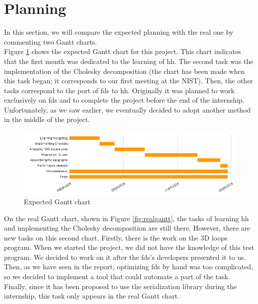 
\clearpage{}
\section{Planning}

In this section, we will compare the expected planning with the real one by
commenting two Gantt charts.\\

Figure \ref{fig:expectedgantt} shows the expected Gantt chart for this
project. This chart indicates that the first month was dedicated to the learning
of \gls{hh}. The second task was the implementation of the Cholesky
decomposition (the chart has been made when this task began; it corresponds to
our first meeting at the NIST). Then, the other tasks correspond to the port of
\gls{fds} to \gls{hh}. Originally it was planned to work exclusively on
\gls{fds} and to complete the project before the end of the internship.
Unfortunately, as we saw earlier, we eventually decided to adopt another method
in the middle of the project.

\begin{figure}[h!]
  \begin{center}
    \includegraphics[scale=0.5]{img/expected-gantt-chart.png}
    \caption{Expected Gantt chart}
    \label{fig:expectedgantt}
  \end{center}
\end{figure}

On the real Gantt chart, shown in Figure \ref{fig:realgantt}, the tasks of
learning \gls{hh} and implementing the Cholesky decomposition are still there.
However, there are new tasks on this second chart. Firstly, there is the work on
the 3D loops program. When we started the project, we did not have the knowledge
of this test program. We decided to work on it after the \gls{fds}'s developers
presented it to us. Then, as we have seen in the report, optimizing \gls{fds} by
hand was too complicated, so we decided to implement a tool that could automate
a part of the task. Finally, since it has been proposed to use the serialization
library during the internship, this task only appears in the real Gantt chart.

